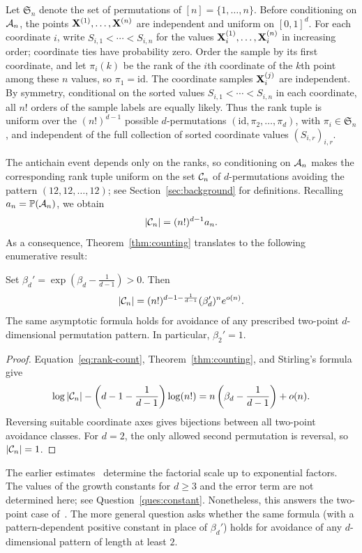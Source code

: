 \documentclass[11pt,letterpaper]{article}
\begin{document}
Let $\mathfrak S_n$ denote the set of permutations of $[n]=\{1,\ldots,n\}$. Before conditioning on $\mathcal A_n$, the points $\mathbf X^{(1)},\ldots,\mathbf X^{(n)}$ are independent and uniform on $[0,1]^d$. For each coordinate $i$, write $S_{i,1}<\cdots<S_{i,n}$ for the values $\mathbf X_i^{(1)},\ldots,\mathbf X_i^{(n)}$ in increasing order; coordinate ties have probability zero.
Order the sample by its first coordinate, and let $\pi_i(k)$ be the rank of the $i$th coordinate of the $k$th point among these $n$ values, so $\pi_1=\mathrm{id}$. The coordinate samples $\mathbf X_i^{(j)}$ are independent. By symmetry, conditional on the sorted values $S_{i,1}<\cdots<S_{i,n}$ in each coordinate, all $n!$ orders of the sample labels are equally likely.
Thus the rank tuple is uniform over the $(n!)^{d-1}$ possible $d$-permutations $(\mathrm{id},\pi_2,\ldots,\pi_d)$, with $\pi_i\in\mathfrak S_n$, and independent of the full collection of sorted coordinate values $(S_{i,r})_{i,r}$.

The antichain event depends only on the ranks, so conditioning on $\mathcal A_n$ makes the corresponding rank tuple uniform on the set $\mathcal C_n$ of $d$-permutations avoiding the pattern $(12,12,\ldots,12)$; see Section~\ref{sec:background} for definitions. Recalling $a_n=\mathbb P(\mathcal A_n)$, we obtain
\begin{equation}\label{eq:rank-count}
      |\mathcal C_n|=(n!)^{d-1}a_n.
\end{equation}
As a consequence, Theorem~\ref{thm:counting} translates to the following enumerative result:
\begin{proposition}\label{prop:counting}\label{cor:counting}
      Set $\beta_d'=\exp\!\left(\beta_d-\frac1{d-1}\right)>0$. Then
      \[
            |\mathcal C_n|=(n!)^{d-1-\frac1{d-1}}(\beta_d')^n e^{o(n)}.
      \]
      The same asymptotic formula holds for avoidance of any prescribed two-point $d$-dimensional permutation pattern. In particular, $\beta_2'=1$.
\end{proposition}
\begin{proof}
      Equation~\eqref{eq:rank-count}, Theorem~\ref{thm:counting}, and Stirling's formula give
      \[
            \log|\mathcal C_n|-\left(d-1-\frac1{d-1}\right)\log(n!) =n\left(\beta_d-\frac1{d-1}\right)+o(n).
      \]
      Reversing suitable coordinate axes gives bijections between all two-point avoidance classes. For $d=2$, the only allowed second permutation is reversal, so $|\mathcal C_n|=1$.
\end{proof}
The earlier estimates~\cite{CK,GP} determine the factorial scale up to exponential factors. The values of the growth constants for $d\ge3$ and the error term are not determined here; see Question~\ref{ques:constant}. Nonetheless, this answers the two-point case of~\cite[Question~9.3]{CK}. The more general question asks whether the same formula (with a pattern-dependent positive constant in place of $\beta_d'$) holds for avoidance of any $d$-dimensional pattern of length at least $2$.
\end{document}
